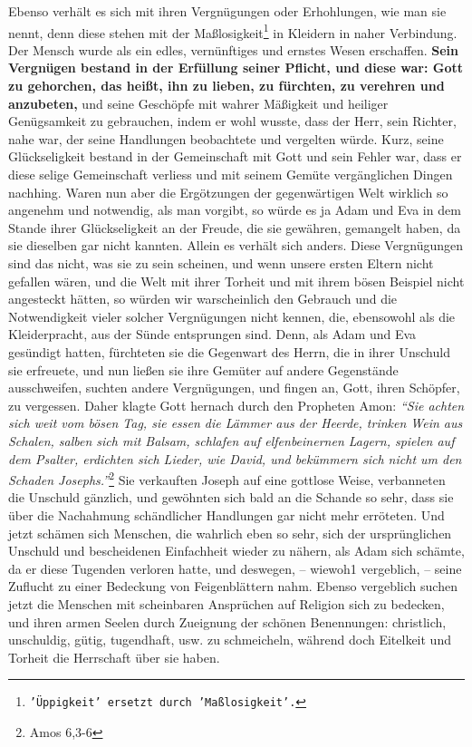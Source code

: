 Ebenso verhält es sich mit ihren Vergnügungen oder Erhohlungen,
wie man sie
nennt, denn diese stehen mit der
Maßlosigkeit\footnote{\texttt{'Üppigkeit' ersetzt durch 'Maßlosigkeit'.}} in
Kleidern in naher
Verbindung. Der
Mensch wurde als ein edles, vernünftiges und ernstes Wesen erschaffen.
\textbf{Sein
Vergnügen bestand in der Erfüllung seiner Pflicht, und diese war: Gott zu
gehorchen, das heißt, ihn zu lieben, zu fürchten, zu verehren und anzubeten,}
und
seine Geschöpfe mit wahrer Mäßigkeit und heiliger Genügsamkeit zu gebrauchen,
indem er wohl wusste, dass der Herr, sein Richter, nahe war, der seine
Handlungen
beobachtete und vergelten würde. Kurz, seine Glückseligkeit bestand in der
Gemeinschaft mit Gott und sein Fehler war, dass er diese selige Gemeinschaft
verliess und mit seinem Gemüte vergänglichen Dingen nachhing. Waren nun aber
die Ergötzungen der gegenwärtigen Welt wirklich so angenehm und notwendig, als
man vorgibt, so würde es ja Adam und Eva in dem Stande ihrer Glückseligkeit an
der Freude, die sie gewähren, gemangelt haben, da sie dieselben gar nicht
kannten. Allein es verhält sich anders. Diese Vergnügungen sind das nicht, was
sie zu sein scheinen, und wenn unsere ersten Eltern nicht gefallen wären, und
die Welt mit ihrer Torheit und mit ihrem bösen Beispiel nicht angesteckt
hätten, so würden wir warscheinlich den Gebrauch und die Notwendigkeit vieler
solcher Vergnügungen nicht kennen, die, ebensowohl als die Kleiderpracht, aus
der Sünde entsprungen sind.  Denn, als Adam und Eva gesündigt
hatten, fürchteten
sie die Gegenwart des Herrn, die in ihrer Unschuld sie erfreuete, und nun ließen
sie ihre Gemüter auf andere Gegenstände ausschweifen, suchten andere
Vergnügungen, und fingen an, Gott, ihren Schöpfer, zu vergessen. Daher klagte
Gott hernach durch den Propheten Amon:
\textit{"`Sie achten sich weit vom bösen Tag,
sie essen die Lämmer aus der Heerde, trinken Wein aus Schalen, salben sich mit
Balsam, schlafen auf elfenbeinernen Lagern, spielen auf dem Psalter, erdichten
sich Lieder, wie David, und bekümmern sich nicht um den Schaden
Josephs."'}\footnote{Amos 6,3-6}
Sie verkauften Joseph auf eine gottlose
Weise, verbanneten die Unschuld gänzlich, und gewöhnten sich bald an die Schande
so sehr, dass sie über die Nachahmung schändlicher Handlungen gar nicht mehr
erröteten. Und jetzt schämen sich Menschen, die wahrlich eben so sehr, sich der
ursprünglichen Unschuld und bescheidenen Einfachheit wieder zu nähern, als Adam
sich schämte, da er diese Tugenden verloren hatte, und deswegen, -- wiewoh1
vergeblich, -- seine Zuflucht zu einer Bedeckung von Feigenblättern nahm. Ebenso
vergeblich suchen jetzt die Menschen mit scheinbaren Ansprüchen auf Religion
sich zu bedecken, und ihren armen Seelen durch Zueignung der schönen
Benennungen: christlich, unschuldig, gütig, tugendhaft, usw. zu schmeicheln,
während doch Eitelkeit und Torheit die Herrschaft über sie haben.

